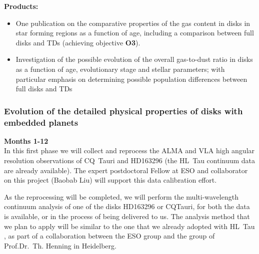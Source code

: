 \documentclass[10pt,fleqn,twoside]{article}
\begin{document}

\smallskip
{\bf Products:} 
\begin{itemize}
\item One publication on the comparative properties of the gas content in disks in star forming regions as a function of age, including a comparison between full disks and TDs (achieving objective {\bf O3}).
\item Investigation of the possible evolution of the overall gas-to-dust ratio in disks as a function of age, evolutionary stage and stellar parameters; with particular emphasis on determining possible population differences between full disks and TDs
\end{itemize}

\subsubsection{Evolution of the detailed physical properties of disks with embedded planets}

{\Tcol\bf Months 1-12}\\
In this first phase we will collect and reprocess the ALMA and VLA high angular resolution observations of CQ~Tauri and HD163296 (the HL~Tau continuum data are already available). The expert postdoctoral Fellow at ESO and collaborator on this project (Baobab Liu) will support this data calibration effort. 

As the reprocessing will be completed, we will perform the multi-wavelength continuum analysis of one of the disks HD163296 or CQTauri, for both the data is available, or in the process of being delivered to us. The analysis method that we plan to apply will be similar to the one that we already adopted with HL~Tau \citep{2016ApJ...821L..16C}, as part of a collaboration between the ESO group and the group of Prof.Dr.~Th. Henning in Heidelberg. 
\end{document}
